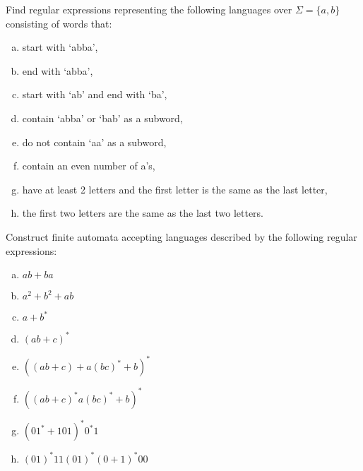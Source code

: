 \documentclass[a4paper,12pt]{amsart}
\begin{document}
\medskip\begin{problem}

    Find regular expressions representing the following languages over $\Sigma = \{a, b\}$ consisting of words that:

    \medskip
    

        \begin{enumerate}[(a)]\setlength\itemsep{12pt}
            \item start with `abba',
            \item end with  `abba',
            \item start with `ab' and end with `ba',
            \item contain `abba' or `bab' as a subword,
            \item do not contain `aa' as a subword,
            \item contain an even number of a's,
            \item have at least 2 letters and the first letter is the same as the last letter,
            \item the first two letters are the same as the last two letters.
        \end{enumerate}


\end{problem}
    
    
\medskip\begin{problem}

    Construct finite automata accepting languages described by the following regular expressions:
    
    \begin{multicols}{2}
    
        \begin{enumerate}[(a)]\setlength\itemsep{12pt}
            \item $ab + ba$
            \item $a^2 + b^2 + ab$
            \item $a + b^*$
            \item $(ab + c)^*$
            \item $((ab + c)+a(bc)^* + b)^*$
            \item $((ab + c)^*a(bc)^* + b)^*$
            \item $(01^* + 101)^*0^*1$
            \item $(01)^*11(01)^*(0 + 1)^*00$
        \end{enumerate}
    
    \end{multicols}
    
\end{problem}
   
\end{document}
